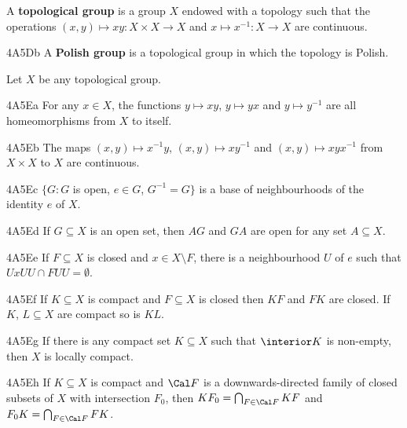  A {\bf topological group} is a group $X$
endowed with a topology such that the operations
$(x,y)\mapsto xy:X\times X\to X$ and $x\mapsto x^{-1}:X\to X$ are
continuous.

\spheader 4A5Db A {\bf Polish group} is a topological group in which the
topology is Polish.

 Let $X$ be any topological group.

\spheader 4A5Ea For any $x\in X$, the functions $y\mapsto xy$,
$y\mapsto yx$ and $y\mapsto y^{-1}$ are all homeomorphisms from $X$ to
itself.

\spheader 4A5Eb The maps $(x,y)\mapsto x^{-1}y$, $(x,y)\mapsto xy^{-1}$
and $(x,y)\mapsto xyx^{-1}$ from $X\times X$ to $X$ are continuous.

\spheader 4A5Ec $\{G:G$ is open, $e\in G$, $G^{-1}=G\}$ is a base of
neighbourhoods of the identity $e$ of $X$.

\spheader 4A5Ed If $G\subseteq X$ is an open set, then $AG$ and $GA$ are
open for any set $A\subseteq X$.   

\spheader 4A5Ee If $F\subseteq X$ is closed and $x\in X\setminus F$,
there is a neighbourhood $U$ of $e$ such that
$UxUU\cap FUU=\emptyset$.   

\spheader 4A5Ef If $K\subseteq X$ is compact and $F\subseteq X$ is
closed then $KF$ and $FK$ are closed.
If $K$, $L\subseteq X$ are compact so is $KL$.

\spheader 4A5Eg If there is any compact set $K\subseteq X$ such that
$\interior K$ is non-empty, then $X$ is locally compact.

\spheader 4A5Eh If $K\subseteq X$ is compact and $\Cal F$ is a
downwards-directed family of closed subsets of $X$ with intersection
$F_0$, then
$KF_0=\bigcap_{F\in\Cal F}KF$ and $F_0K=\bigcap_{F\in\Cal F}FK$.

